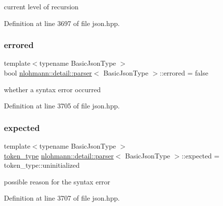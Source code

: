 current level of recursion 



Definition at line 3697 of file json.\+hpp.

\mbox{\label{classnlohmann_1_1detail_1_1parser_af6a116454a868ebb6628c6137c3dd77d}} 
\subsubsection{\texorpdfstring{errored}{errored}}
{\footnotesize\ttfamily template$<$typename Basic\+Json\+Type $>$ \\
bool \hyperlink{classnlohmann_1_1detail_1_1parser}{nlohmann\+::detail\+::parser}$<$ Basic\+Json\+Type $>$\+::errored = false\hspace{0.3cm}{\ttfamily [private]}}



whether a syntax error occurred 



Definition at line 3705 of file json.\+hpp.

\mbox{\label{classnlohmann_1_1detail_1_1parser_ad055620d886819b26dabc1dfb80c7fb7}} 
\subsubsection{\texorpdfstring{expected}{expected}}
{\footnotesize\ttfamily template$<$typename Basic\+Json\+Type $>$ \\
\hyperlink{classnlohmann_1_1detail_1_1parser_a21d247111b332785b7acf3f8e487d117}{token\+\_\+type} \hyperlink{classnlohmann_1_1detail_1_1parser}{nlohmann\+::detail\+::parser}$<$ Basic\+Json\+Type $>$\+::expected = token\+\_\+type\+::uninitialized\hspace{0.3cm}{\ttfamily [private]}}



possible reason for the syntax error 



Definition at line 3707 of file json.\+hpp.

